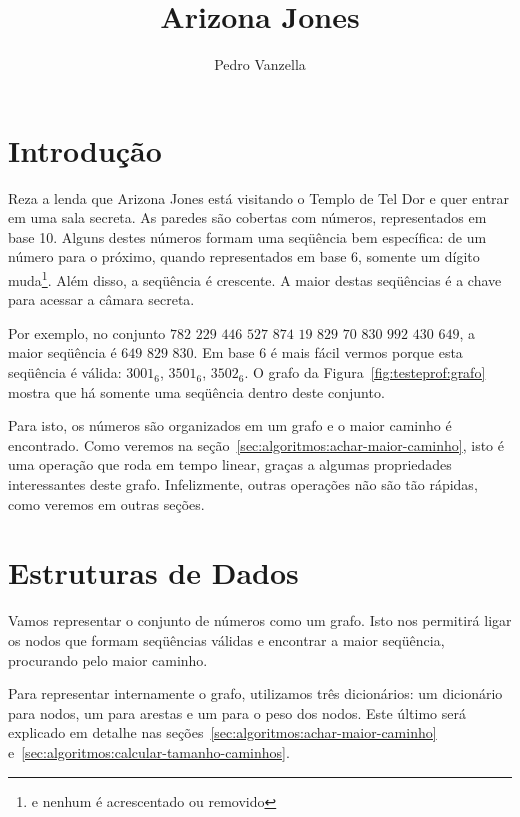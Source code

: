 \documentclass[12pt]{article}
\title{Arizona Jones}
\author{Pedro Vanzella}
\begin{document}
\maketitle


\section{Introdução}\label{sec:intro}

Reza a lenda que Arizona Jones está visitando o Templo de Tel Dor e quer entrar em uma sala secreta. As paredes são cobertas com números, representados em base 10. Alguns destes números formam uma seqüência bem específica: de um número para o próximo, quando representados em base 6, somente um dígito muda\footnote{e nenhum é acrescentado ou removido}. Além disso, a seqüência é crescente. A maior destas seqüências é a chave para acessar a câmara secreta.

Por exemplo, no conjunto $782$ $229$ $446$ $527$ $874$ $19$ $829$ $70$ $830$ $992$ $430$ $649$, a maior seqüência é $649$ $829$ $830$. Em base 6 é mais fácil vermos porque esta seqüência é válida: $3001_6$, $3501_6$, $3502_6$. O grafo da Figura~\ref{fig:testeprof:grafo} mostra que há somente uma seqüência dentro deste conjunto.

Para isto, os números são organizados em um grafo e o maior caminho é encontrado. Como veremos na se\c{c}ão~\ref{sec:algoritmos:achar-maior-caminho}, isto é uma opera\c{c}ão que roda em tempo linear, gra\c{c}as a algumas propriedades interessantes deste grafo. Infelizmente, outras operações não são tão rápidas, como veremos em outras seções.

\section{Estruturas de Dados}\label{sec:estruturas}
Vamos representar o conjunto de números como um grafo. Isto nos permitirá ligar os nodos que formam seqüências válidas e encontrar a maior seqüência, procurando pelo maior caminho.

Para representar internamente o grafo, utilizamos três dicionários: um dicionário para nodos, um para arestas e um para o peso dos nodos. Este último será explicado em detalhe nas se\c{c}ões~\ref{sec:algoritmos:achar-maior-caminho} e~\ref{sec:algoritmos:calcular-tamanho-caminhos}.
\end{document}
